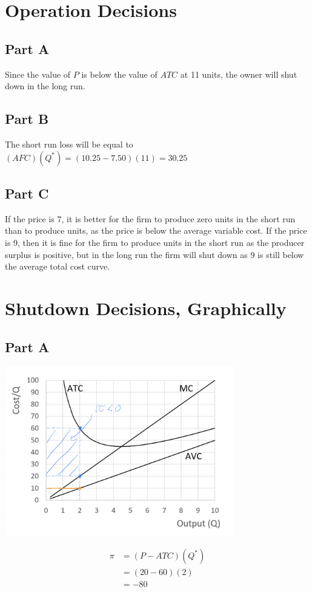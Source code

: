 \documentclass[8pt]{extarticle}
\begin{document}
{\section{Operation Decisions}
\label{sec:Operation Decisions}
\subsection*{Part A}
Since the value of $P$ is below the value of $ATC$ at 11 units, the owner will shut down in the long run.
\subsection*{Part B}
The short run loss will be equal to $(AFC)(Q^*) = (10.25-7.50)(11) = 30.25$
\subsection*{Part C}
If the price is 7, it is better for the firm to produce zero units in the short run than to produce units, as the price is below the average variable cost. If the price is 9, then it is fine for the firm to produce units in the short run as the producer surplus is positive, but in the long run the firm will shut down as 9 is still below the average total cost curve.
\section{Shutdown Decisions, Graphically}
\label{sec:Shutdown Decisions, Graphically}
\subsection*{Part A}%
\label{sub:Part A}
\begin{center}
	\includegraphics[width=10cm]{HW7Q13A}
\end{center}
\begin{align*}
	\label{eq:}
	\pi &= (P-ATC)(Q^*) \\
	&= (20-60)(2) \\
	&= -80
\end{align*}
}
\end{document}
